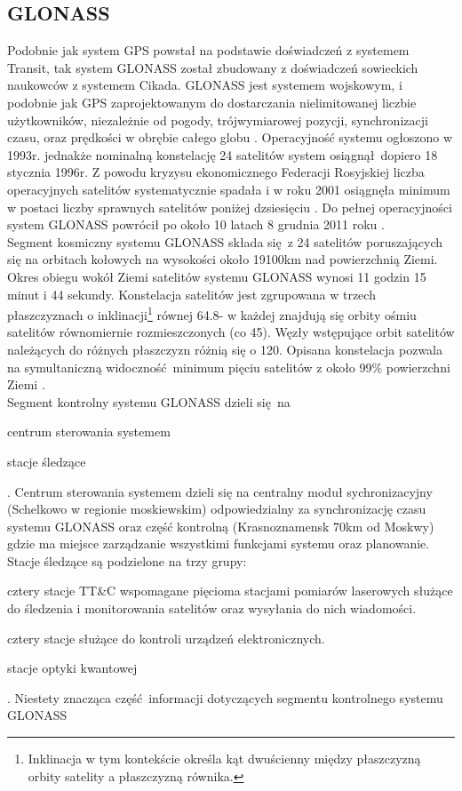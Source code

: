  	\subsection{GLONASS}
Podobnie jak system GPS powstał na podstawie doświadczeń z systemem Transit, tak system GLONASS został zbudowany z doświadczeń sowieckich naukowców 
z systemem Cikada. GLONASS jest systemem wojskowym, i podobnie jak GPS zaprojektowanym do dostarczania nielimitowanej liczbie użytkowników, niezależnie od pogody,
trójwymiarowej pozycji, synchronizacji czasu, oraz prędkości w obrębie całego globu \cite[][strona 342]{hofmann_gnss}. Operacyjność systemu ogłoszono w 1993r. 
jednakże nominalną konstelację 24 satelitów system osiągnął dopiero 18 stycznia 1996r. Z powodu kryzysu ekonomicznego Federacji Rosyjskiej liczba operacyjnych 
satelitów systematycznie spadała i w roku 2001 osiągnęła minimum w postaci liczby sprawnych satelitów poniżej dzsiesięciu \cite[][strona 342]{hofmann_gnss}.
Do pełnej operacyjności system GLONASS powrócił po około 10 latach 8 grudnia 2011 roku \cite[]{glonass_geoforum}.\\
\indent Segment kosmiczny systemu GLONASS składa się z 24 satelitów poruszających się na orbitach kołowych na wysokości około 19100km nad powierzchnią Ziemi.
Okres obiegu wokół Ziemi satelitów systemu GLONASS wynosi 11 godzin 15 minut i 44 sekundy. Konstelacja satelitów jest zgrupowana w trzech płaszczyznach o inklinacji\footnote{
Inklinacja w tym kontekście określa kąt dwuścienny między płaszczyzną orbity satelity a płaszczyzną równika.} równej 64.8\degree - w każdej znajdują się 
orbity ośmiu satelitów równomiernie rozmieszczonych (co 45\degree). Węzły wstępujące orbit satelitów należących do różnych płaszczyzn różnią się o 120\degree.
Opisana konstelacja pozwala na symultaniczną widoczność minimum pięciu satelitów z około 99\% powierzchni Ziemi \cite[][strona 349]{hofmann_gnss}.\\
\indent Segment kontrolny systemu GLONASS dzieli się na \begin{inparaenum}[1)] \item centrum sterowania systemem 
\item stacje śledzące \end{inparaenum}. Centrum sterowania systemem dzieli się na centralny moduł sychronizacyjny (Schelkowo w regionie moskiewskim) odpowiedzialny
za synchronizację czasu systemu GLONASS oraz część kontrolną (Krasnoznamensk 70km od Moskwy) gdzie ma miejsce zarządzanie wszystkimi funkcjami systemu oraz planowanie.
Stacje śledzące są podzielone na trzy grupy: \begin{inparaenum}[a)] \item cztery stacje TT\&C wspomagane pięcioma stacjami pomiarów laserowych służące do
śledzenia i monitorowania satelitów oraz wysyłania do nich wiadomości. \item cztery stacje służące do kontroli urządzeń elektronicznych. 
\item stacje optyki kwantowej \end{inparaenum}. Niestety znacząca część informacji dotyczących segmentu kontrolnego systemu GLONASS

